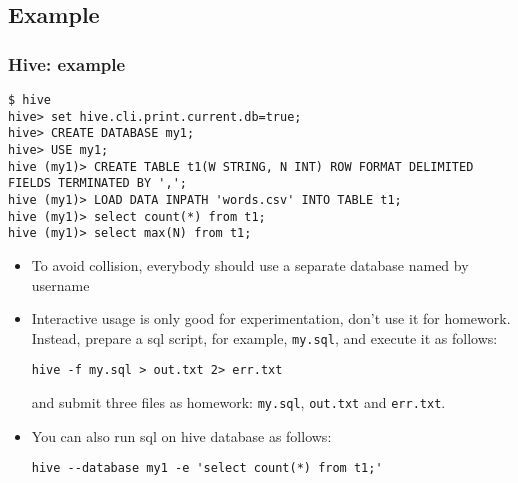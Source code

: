 \documentclass{beamer}
\begin{document}
\subsection{Example}
\begin{frame}[fragile]
  \frametitle{Hive: example}
{\color{mycolorcode}
  \begin{lstlisting}[frame=single, basicstyle=\tiny]
$ hive
hive> set hive.cli.print.current.db=true;
hive> CREATE DATABASE my1;
hive> USE my1;
hive (my1)> CREATE TABLE t1(W STRING, N INT) ROW FORMAT DELIMITED FIELDS TERMINATED BY ',';
hive (my1)> LOAD DATA INPATH 'words.csv' INTO TABLE t1;
hive (my1)> select count(*) from t1;
hive (my1)> select max(N) from t1;
\end{lstlisting}
}
\begin{itemize}
\item To avoid collision, everybody should use a separate database named by username
\item Interactive usage is only good for experimentation, don't use it for homework. Instead, prepare
  a sql script, for example, {\color{mycolorcli}\verb|my.sql|}, and execute it as follows:
{\color{mycolorcli}
\begin{verbatim}
hive -f my.sql > out.txt 2> err.txt
\end{verbatim}
}
and submit three files as homework: {\color{mycolorcli}\verb|my.sql|}, {\color{mycolorcli}\verb|out.txt|} and 
{\color{mycolorcli}\verb|err.txt|}.
\item You can also run sql on hive database as follows:
{\color{mycolorcli}
\begin{verbatim}
hive --database my1 -e 'select count(*) from t1;'
\end{verbatim}
}
\end{itemize}

\end{frame}
\end{document}
